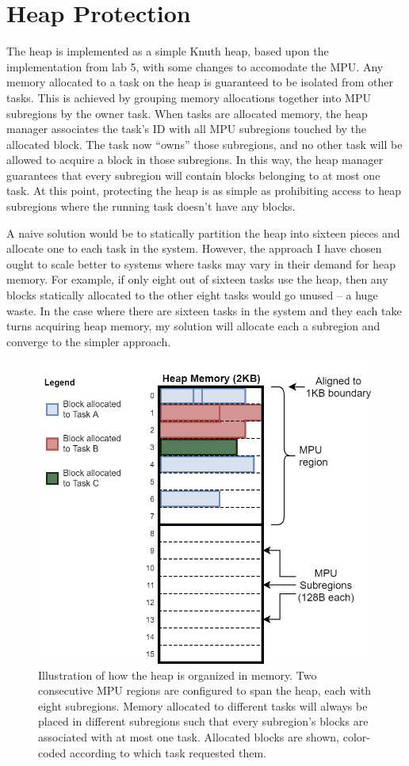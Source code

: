 \section{Heap Protection}

The heap is implemented as a simple Knuth heap, based upon the implementation from lab 5, with some changes to accomodate the MPU. Any memory allocated to a task on the heap is guaranteed to be isolated from other tasks. This is achieved by grouping memory allocations together into MPU subregions by the owner task. When tasks are allocated memory, the heap manager associates the task's ID with all MPU subregions touched by the allocated block. The task now ``owns'' those subregions, and no other task will be allowed to acquire a block in those subregions. In this way, the heap manager guarantees that every subregion will contain blocks belonging to at most one task. At this point, protecting the heap is as simple as prohibiting access to heap subregions where the running task doesn't have any blocks.

A naive solution would be to statically partition the heap into sixteen pieces and allocate one to each task in the system. However, the approach I have chosen ought to scale better to systems where tasks may vary in their demand for heap memory. For example, if only eight out of sixteen tasks use the heap, then any blocks statically allocated to the other eight tasks would go unused -- a huge waste. In the case where there are sixteen tasks in the system and they each take turns acquiring heap memory, my solution will allocate each a subregion and converge to the simpler approach.

\begin{figure}[hbtp]
	\centering
	\includegraphics[width=0.7\linewidth]{figs/heap_prot.png}
	\caption{Illustration of how the heap is organized in memory. Two consecutive MPU regions are configured to span the heap, each with eight subregions. Memory allocated to different tasks will always be placed in different subregions such that every subregion's blocks are associated with at most one task. Allocated blocks are shown, color-coded according to which task requested them.}
	\label{fig:heap_prot}
\end{figure}

